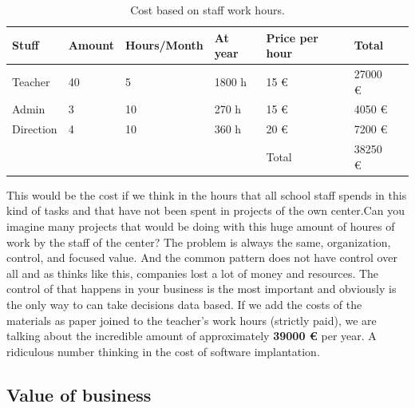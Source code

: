\begin{table}[H]
\centering

\begin{tabular}{@{}lllllll@{}}

Stuff & Amount & Hours/Month & At year & Price per hour & Total  \\
\midrule

Teacher     & 40 & 5    & 1800 h   & 15 \euro  & 27000  \euro  \\
Admin       & 3  & 10   & 270 h   & 15 \euro  & 4050   \euro  \\
Direction   & 4  & 10   & 360 h   & 20 \euro  & 7200   \euro  \\

\midrule
& & & & Total & 38250 \euro \\
\end{tabular}
\caption{Cost based on staff work hours.}
\label{my-label}
\end{table}

\noindent This would be the cost if we think in the hours that all school staff spends
in this kind of tasks and that have not been spent in projects of the own
center.Can you imagine many projects that would be doing with this huge
amount of houres of work by the staff of the center?
\intro
The problem is always the same, organization, control, and focused value. And
the common pattern does not have control over all and as thinks like this,
companies lost a lot of money and resources. The control of that happens in your
business is the most important and obviously is the only way to can take
decisions data based.
\intro
If we add the costs of the materials as paper joined to the teacher's work hours
(strictly paid), we are talking about the incredible amount of approximately
\textbf{39000 \euro} per year. A ridiculous number thinking in the cost of
software implantation.

\subsection{Value of business}

